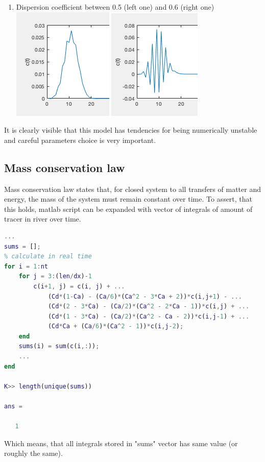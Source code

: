 \documentclass[onecolumn]{article}
\begin{document}
\begin{enumerate}
    \item Dispersion coefficient between 0.5 (left one) and 0.6 (right one) \\
    \includegraphics[scale=1]{d05}
	\includegraphics[scale=1]{d06}
\end{enumerate}

It is clearly visible that this model has tendencies for being numerically unstable and careful parameters choice is very important.

\subsection{Mass conservation law}
Mass conservation law states that, for closed system to all transfers of matter and energy, the mass of the system must remain constant over time. To assert, that this holds, matlab script can be expanded with vector of integrals of amount of tracer in river over time. \\

\begin{lstlisting}[language=Matlab,frame=single,label={lst:autocorr},breaklines=true,caption={Matlab script for explicit taylor method}]
...
sums = [];
% calculate in real time
for i = 1:nt
    for j = 3:(len/dx)-1
        c(i+1, j) = c(i, j) + ...
            (Cd*(1-Ca) - (Ca/6)*(Ca^2 - 3*Ca + 2))*c(i,j+1) - ...
            (Cd*(2 - 3*Ca) - (Ca/2)*(Ca^2 - 2*Ca - 1))*c(i,j) + ...
            (Cd*(1 - 3*Ca) - (Ca/2)*(Ca^2 - Ca - 2))*c(i,j-1) + ...
            (Cd*Ca + (Ca/6)*(Ca^2 - 1))*c(i,j-2);
    end
	sums(i) = sum(c(i,:));
    ...
end

K>> length(unique(sums))

ans =

   1
\end{lstlisting}
Which means, that all integrals stored in "sums" vector has same value (or roughly the same).
\end{document}
